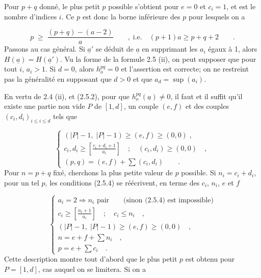 
Pour $p+q$ donné, le plus petit $p$ possible s'obtient pour $e = 0$ et $c_i = 1$, et est le nombre d'indices $i$. Ce $p$ est donc la borne inférieure des $p$ pour lesquels on a

\begin{equation*}
p \;\geqslant\; \frac{(p+q)-(a-2)}{a} \qquad , \; \mbox{i.e.} \quad (p+1)a \geqslant p+q+2 \qquad .
\end{equation*}
Passons au cas général. Si $\underline{a}'$ se déduit de $\underline{a}$ en supprimant les $a_i$ égaux à 1, alors $H(\underline{a}) = H(\underline{a}')$. Vu la forme de la formule 2.5 (ii), on peut supposer que pour tout $i$, $a_i > 1$. Si $d = 0$, alors $h_o^{pq} = 0$ et l'assertion est correcte; on ne restreint pas la généralité en supposant que $d > 0$ et que $a_d = \sup(a_i)$.

En vertu de 2.4 (ii), et (2.5.2), pour que $h_o^{pq}(\underline{a}) \neq 0$, il faut et il suffit qu'il existe une partie non vide $P$ de $[1,d]$, un couple $(e,f)$ et des couples $(c_i,d_i)_{i \leqslant i \leqslant d}$ tels que

\begin{equation}\tag{2.5.4}
\left\{
\begin{array}{l}
(|P|-1, \; |P|-1) \geqslant (e,f) \geqslant (0,0) \; , \\[3mm]
c_i,d_i \geqslant \left[{\displaystyle \frac{c_i+d_i+1}{a_i}}\right] \quad ; \quad (c_i,d_i) \geqslant (0,0) \quad , \\[3mm]
(p,q) = (e,f) + \sum (c_i,d_i) \qquad .
\end{array}
\right.
\end{equation}
Pour $n = p+q$ fixé, cherchons la plus petite valeur de $p$ possible. Si $n_i = c_i + d_i$, pour un tel $p$, les conditions (2.5.4) se réécrivent, en terme des $c_i$, $n_i$, $e$ et $f$ 



\begin{equation}\tag{2.5.5}
\left\{
\begin{array}{l}
a_i = 2 \Longrightarrow n_i \mbox{ pair} \qquad \mbox{(sinon (2.5.4) est impossible)} \\[3mm]
c_i \geq \left[ \displaystyle\frac{n_i+1}{a_i} \right] \quad ; \quad c_i \leq n_i \quad , \\[3mm]
(|P|-1, \; |P|-1) \geq (e,f) \geq (0,0) \quad , \\[3mm]
n = e+f+ \sum n_i \quad , \\[3mm]
p = e + \sum c_i \quad .
\end{array}
\right.
\end{equation}
Cette description montre tout d'abord que le plus petit $p$ est obtenu pour $P = [1,d]$, cas auquel on se limitera. Si on a

